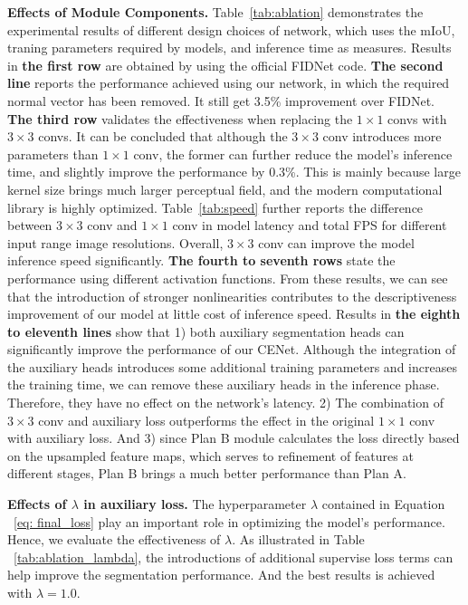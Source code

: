 \documentclass{article}
\begin{document}
\noindent\textbf{Effects  of Module Components.} 
Table~\ref{tab:ablation} demonstrates the experimental results of different design choices of network, which uses the mIoU, traning parameters required by models, and inference time as measures. Results in \textbf{the first row} are obtained by using the official FIDNet code. \textbf{The second line} reports the performance achieved using our network, in which the required normal vector has been removed. It still get  3.5\% improvement over FIDNet. \textbf{The third row} validates the effectiveness when replacing the $1\times1$ convs with $3\times3$ convs. It can be concluded that although the $3\times3$ conv introduces more parameters than $1\times1$ conv, the former can further reduce the model's inference time, and slightly improve the performance by 0.3\%. This is mainly because large kernel size brings much larger perceptual field, and the modern computational library is highly optimized. Table~\ref{tab:speed} further reports the difference between $3\times3$ conv and $1\times1$ conv in model latency and total FPS for different input range image resolutions. Overall, $3\times3$ conv can improve the model inference speed significantly. \textbf{The fourth to seventh rows} state the performance using different activation functions. From these results, we can see that the introduction of stronger nonlinearities contributes to the descriptiveness improvement of our model at little cost of inference speed. Results in \textbf{the eighth to eleventh lines} show that 1) both auxiliary segmentation heads can significantly improve the performance of our CENet. Although the integration of the auxiliary heads introduces some additional training parameters and increases the training time, we can remove these auxiliary heads in the inference phase. Therefore, they have no effect on the network's latency. 2) The combination of $3\times3$ conv and auxiliary loss outperforms the effect in the original $1\times1$ conv with auxiliary loss. And 3) since Plan B module calculates the loss directly based on the upsampled feature maps, which serves to refinement of features at different stages, Plan B brings a much better performance than Plan A. 

\noindent\textbf{Effects  of $\lambda$ in auxiliary loss.} The hyperparameter $\lambda$ contained in Equation ~\ref{eq: final_loss} play an important role in optimizing the model's performance. Hence, we evaluate the effectiveness of $\lambda$. As illustrated in Table ~\ref{tab:ablation_lambda}, the introductions of additional supervise loss terms can help improve the segmentation performance. And the best results is achieved with $\lambda=1.0$.   
\end{document}
